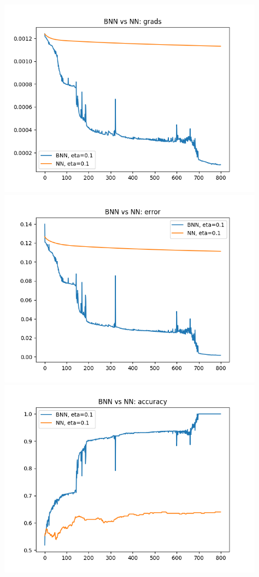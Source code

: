 \documentclass[11pt]{article}
\begin{document}
\begin{figure}[H]
\includegraphics[scale=0.5]{images/BNN_vs_NN/BNN_vs_NN_grads}
\includegraphics[scale=0.5]{images/BNN_vs_NN/BNN_vs_NN_error}
\includegraphics[scale=0.5]{images/BNN_vs_NN/BNN_vs_NN_accuracy}

\end{figure}
\end{document}
